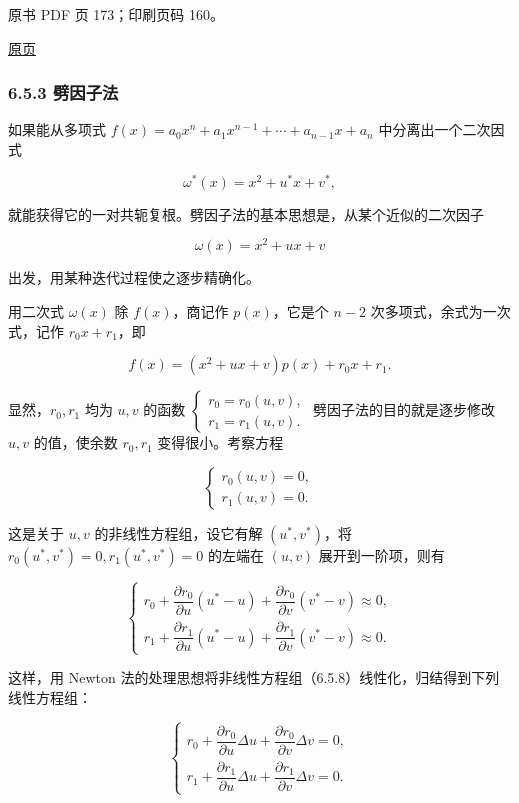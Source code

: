 \clearpage

原书 PDF 页 173；印刷页码 160。

\href{source-images/pdf-173.jpeg}{原页}

\subsubsection{6.5.3 劈因子法}\label{ch06-ux5288ux56e0ux5b50ux6cd5}

如果能从多项式 \(f(x)=a_0x^n+a_1x^{n-1}+\cdots+a_{n-1}x+a_n\) 中分离出一个二次因式

\[
\omega^*(x)=x^2+u^*x+v^*,
\]

就能获得它的一对共轭复根。劈因子法的基本思想是，从某个近似的二次因子

\[
\omega(x)=x^2+ux+v
\]

出发，用某种迭代过程使之逐步精确化。

用二次式 \(\omega(x)\) 除 \(f(x)\)，商记作 \(p(x)\)，它是个 \(n-2\) 次多项式，余式为一次式，记作 \(r_0x+r_1\)，即

\[
f(x)=(x^2+ux+v)p(x)+r_0x+r_1.
\tag{6.5.7}
\]

显然，\(r_0,r_1\) 均为 \(u,v\) 的函数 \(\begin{cases}r_0=r_0(u,v),\\r_1=r_1(u,v).\end{cases}\) 劈因子法的目的就是逐步修改 \(u,v\) 的值，使余数 \(r_0,r_1\) 变得很小。考察方程

\[
\begin{cases}
r_0(u,v)=0,\\
r_1(u,v)=0.
\end{cases}
\tag{6.5.8}
\]

这是关于 \(u,v\) 的非线性方程组，设它有解 \((u^*,v^*)\)，将 \(r_0(u^*,v^*)=0,r_1(u^*,v^*)=0\) 的左端在 \((u,v)\) 展开到一阶项，则有

\[
\begin{cases}
r_0+\dfrac{\partial r_0}{\partial u}(u^*-u)+\dfrac{\partial r_0}{\partial v}(v^*-v)\approx0,\\
r_1+\dfrac{\partial r_1}{\partial u}(u^*-u)+\dfrac{\partial r_1}{\partial v}(v^*-v)\approx0.
\end{cases}
\]

这样，用 Newton 法的处理思想将非线性方程组（6.5.8）线性化，归结得到下列线性方程组：

\[
\begin{cases}
r_0+\dfrac{\partial r_0}{\partial u}\Delta u+\dfrac{\partial r_0}{\partial v}\Delta v=0,\\
r_1+\dfrac{\partial r_1}{\partial u}\Delta u+\dfrac{\partial r_1}{\partial v}\Delta v=0.
\end{cases}
\tag{6.5.9}
\]

